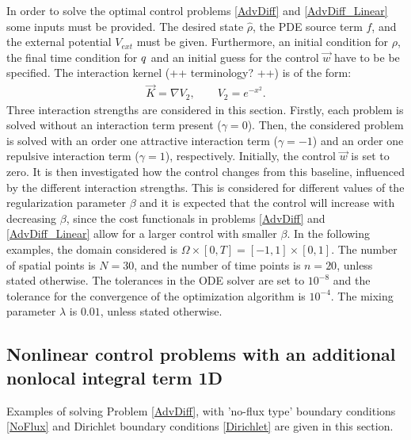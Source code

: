 
In order to solve the optimal control problems \eqref{AdvDiff} and \eqref{AdvDiff_Linear} some inputs must be provided. The desired state $\widehat \rho$, the PDE source term $f$, and the external potential $V_{ext}$ must be given. Furthermore, an initial condition for $\rho$, the final time condition for $q$ and an initial guess for the control $\vec{w}$ have to be be specified. 
The interaction kernel (++ terminology? ++) is of the form:
\begin{align*}
\vec{K} = \nabla V_2, \qquad V_2 = e^{-x^2}.
\end{align*}
Three interaction strengths are considered in this section. Firstly, each problem is solved without an interaction term present ($\gamma = 0$). Then, the considered problem is solved with an order one attractive interaction term ($\gamma = -1$) and an order one repulsive interaction term ($\gamma = 1$), respectively. Initially, the control $\vec{w}$ is set to zero. It is then investigated how the control changes from this baseline, influenced by the different interaction strengths. This is considered for different values of the regularization parameter $\beta$ and it is expected that the control will increase with decreasing $\beta$, since the cost functionals in problems \eqref{AdvDiff} and \eqref{AdvDiff_Linear} allow for a larger control with smaller $\beta$.
In the following examples, the domain considered is $\Omega \times [0,T] = [-1,1] \times [0,1]$. The number of spatial points is $N=30$, and the number of time points is $n=20$, unless stated otherwise. The tolerances in the ODE solver are set to $10^{-8}$ and the tolerance for the convergence of the optimization algorithm is $10^{-4}$. The mixing parameter $\lambda$ is $0.01$, unless stated otherwise.
\subsection{Nonlinear control problems with an additional nonlocal integral term 1D} \label{sec:Examples1d}
Examples of solving Problem \eqref{AdvDiff}, with 'no-flux type' boundary conditions \eqref{NoFlux} and Dirichlet boundary conditions \eqref{Dirichlet} are given in this section. 
 
